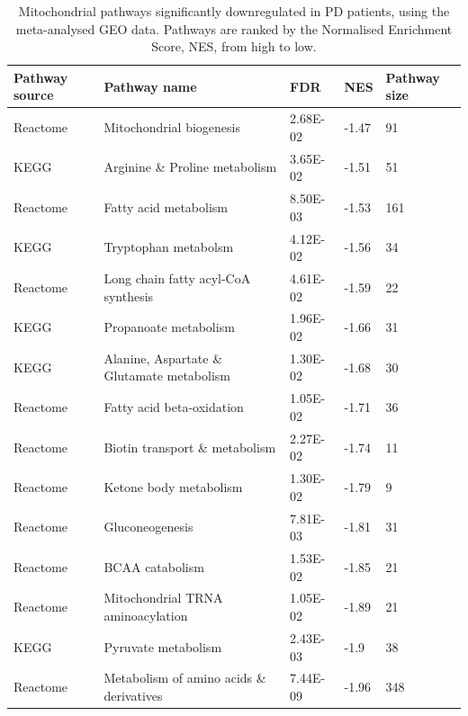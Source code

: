 \documentclass{article}
\begin{document}
\begin{table}[h]
\centering
\caption{Mitochondrial pathways significantly downregulated in PD patients, using the meta-analysed GEO data. Pathways are ranked by the Normalised Enrichment Score, NES, from high to low.}
\begin{tabular}{|l|l|l|l|l|}
\hline
Pathway source & Pathway name                                   & FDR      & NES   & Pathway size \\ \hline
Reactome       & Mitochondrial biogenesis                       & 2.68E-02 & -1.47 & 91           \\ \hline
KEGG           & Arginine \& Proline metabolism                 & 3.65E-02 & -1.51 & 51           \\ \hline
Reactome       & Fatty acid metabolism                          & 8.50E-03 & -1.53 & 161          \\ \hline
KEGG           & Tryptophan metabolsm                           & 4.12E-02 & -1.56 & 34           \\ \hline
Reactome       & Long chain fatty acyl-CoA synthesis            & 4.61E-02 & -1.59 & 22           \\ \hline
KEGG           & Propanoate metabolism                          & 1.96E-02 & -1.66 & 31           \\ \hline
KEGG           & Alanine, Aspartate \& Glutamate metabolism     & 1.30E-02 & -1.68 & 30           \\ \hline
Reactome       & Fatty acid beta-oxidation                      & 1.05E-02 & -1.71 & 36           \\ \hline
Reactome       & Biotin transport \& metabolism                 & 2.27E-02 & -1.74 & 11           \\ \hline
Reactome       & Ketone body metabolism                         & 1.30E-02 & -1.79 & 9            \\ \hline
Reactome       & Gluconeogenesis                                & 7.81E-03 & -1.81 & 31           \\ \hline
Reactome       & BCAA catabolism                                & 1.53E-02 & -1.85 & 21           \\ \hline
Reactome       & Mitochondrial TRNA aminoacylation              & 1.05E-02 & -1.89 & 21           \\ \hline
KEGG           & Pyruvate metabolism                            & 2.43E-03 & -1.9  & 38           \\ \hline
Reactome       & Metabolism of amino acids \& derivatives       & 7.44E-09 & -1.96 & 348          \\ \hline

\end{tabular}
\end{table}
\end{document}
